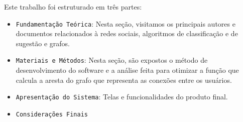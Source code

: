 Este trabalho foi estruturado em três partes:
\begin{itemize}

\item \verb#Fundamentação Teórica#: Nesta seção, visitamos os principais autores e documentos relacionados à redes sociais, algoritmos de classificação e de sugestão e grafos.

\item \verb#Materiais e Métodos#: Nesta seção, são expostos o método de desenvolvimento do software e a análise feita para otimizar a função que calcula a aresta do grafo que representa as conexões entre os usuários.

\item \verb#Apresentação do Sistema#: Telas e funcionalidades do produto final.

\item \verb#Considerações Finais#

\end{itemize}
